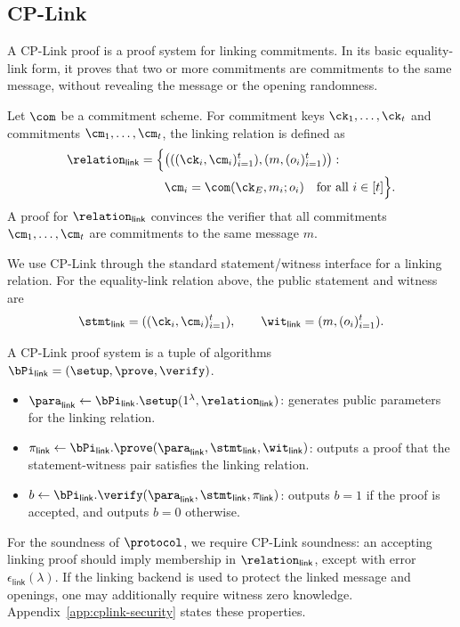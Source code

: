 \subsection{CP-Link}
\label{sec:prelim-cplink}

A CP-Link proof is a proof system for linking commitments. In its basic
equality-link form, it proves that two or more commitments are commitments to
the same message, without revealing the message or the opening randomness.

Let $\com$ be a commitment scheme. For commitment keys
$\ck_1,\ldots,\ck_t$ and commitments $\cm_1,\ldots,\cm_t$, the linking relation is defined as
\[
\begin{aligned}
\relation_{\mathsf{link}}
=
\Big\{
&\big(
((\ck_i,\cm_i)_{i=1}^{t}),
(m,(o_i)_{i=1}^{t})
\big)
:\\
&\cm_i = \com(\ck_E, m_i; o_i)
\quad \text{for all } i\in[t]
\Big\}.
\end{aligned}
\]
A proof for $\relation_{\mathsf{link}}$ convinces the verifier that all commitments $\cm_1,\ldots,\cm_t$ are commitments to the same message $m$.

We use CP-Link through the standard statement/witness interface for a linking
relation.  For the equality-link relation above, the public statement and
witness are
\[
  \stmt_{\mathsf{link}}
  =
  ((\ck_i,\cm_i)_{i=1}^{t}),
  \qquad
  \wit_{\mathsf{link}}
  =
  (m,(o_i)_{i=1}^{t}).
\]

A CP-Link proof system is a tuple of algorithms
$\bPi_{\mathsf{link}}=(\setup,\prove,\verify)$.

\begin{itemize}
\item $\para_{\mathsf{link}} \gets
\bPi_{\mathsf{link}}.\setup(1^\lambda,\relation_{\mathsf{link}})$:
generates public parameters for the linking relation.

\item $\pi_{\mathsf{link}} \gets
\bPi_{\mathsf{link}}.\prove(
\para_{\mathsf{link}},
\stmt_{\mathsf{link}},
\wit_{\mathsf{link}})$:
outputs a proof that the statement-witness pair satisfies the linking relation.

\item $b \gets
\bPi_{\mathsf{link}}.\verify(
\para_{\mathsf{link}},
\stmt_{\mathsf{link}},
\pi_{\mathsf{link}})$:
outputs $b=1$ if the proof is accepted, and outputs $b=0$ otherwise.
\end{itemize}

\begin{remark}
For the soundness of \(\protocol\), we require CP-Link soundness: an accepting
linking proof should imply membership in \(\relation_{\mathsf{link}}\), except
with error \(\epsilon_{\mathsf{link}}(\lambda)\).  If the linking backend is used
to protect the linked message and openings, one may additionally require witness
zero knowledge.  Appendix~\ref{app:cplink-security} states these properties.
\end{remark}

